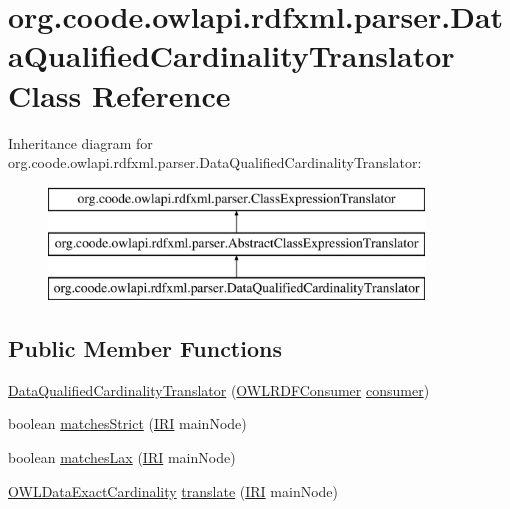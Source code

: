 \hypertarget{classorg_1_1coode_1_1owlapi_1_1rdfxml_1_1parser_1_1_data_qualified_cardinality_translator}{\section{org.\-coode.\-owlapi.\-rdfxml.\-parser.\-Data\-Qualified\-Cardinality\-Translator Class Reference}
\label{classorg_1_1coode_1_1owlapi_1_1rdfxml_1_1parser_1_1_data_qualified_cardinality_translator}
}
Inheritance diagram for org.\-coode.\-owlapi.\-rdfxml.\-parser.\-Data\-Qualified\-Cardinality\-Translator\-:\begin{figure}[H]
\begin{center}
\leavevmode
\includegraphics[height=3.000000cm]{classorg_1_1coode_1_1owlapi_1_1rdfxml_1_1parser_1_1_data_qualified_cardinality_translator}
\end{center}
\end{figure}
\subsection*{Public Member Functions}
\begin{DoxyCompactItemize}
\item 
\hyperlink{classorg_1_1coode_1_1owlapi_1_1rdfxml_1_1parser_1_1_data_qualified_cardinality_translator_a5f4ab99b1add9173834013d7562a4985}{Data\-Qualified\-Cardinality\-Translator} (\hyperlink{classorg_1_1coode_1_1owlapi_1_1rdfxml_1_1parser_1_1_o_w_l_r_d_f_consumer}{O\-W\-L\-R\-D\-F\-Consumer} \hyperlink{classorg_1_1coode_1_1owlapi_1_1rdfxml_1_1parser_1_1_abstract_class_expression_translator_ae547084cdd5b92c03835b5aa404f823b}{consumer})
\item 
boolean \hyperlink{classorg_1_1coode_1_1owlapi_1_1rdfxml_1_1parser_1_1_data_qualified_cardinality_translator_a4ead50f502eb3f0fc2e531feeff98a86}{matches\-Strict} (\hyperlink{classorg_1_1semanticweb_1_1owlapi_1_1model_1_1_i_r_i}{I\-R\-I} main\-Node)
\item 
boolean \hyperlink{classorg_1_1coode_1_1owlapi_1_1rdfxml_1_1parser_1_1_data_qualified_cardinality_translator_a6e2489c9377024ddcd0cf9db2b1e7b6a}{matches\-Lax} (\hyperlink{classorg_1_1semanticweb_1_1owlapi_1_1model_1_1_i_r_i}{I\-R\-I} main\-Node)
\item 
\hyperlink{interfaceorg_1_1semanticweb_1_1owlapi_1_1model_1_1_o_w_l_data_exact_cardinality}{O\-W\-L\-Data\-Exact\-Cardinality} \hyperlink{classorg_1_1coode_1_1owlapi_1_1rdfxml_1_1parser_1_1_data_qualified_cardinality_translator_a5643c574501a052e886d8701a56ffb0f}{translate} (\hyperlink{classorg_1_1semanticweb_1_1owlapi_1_1model_1_1_i_r_i}{I\-R\-I} main\-Node)
\end{DoxyCompactItemize}

